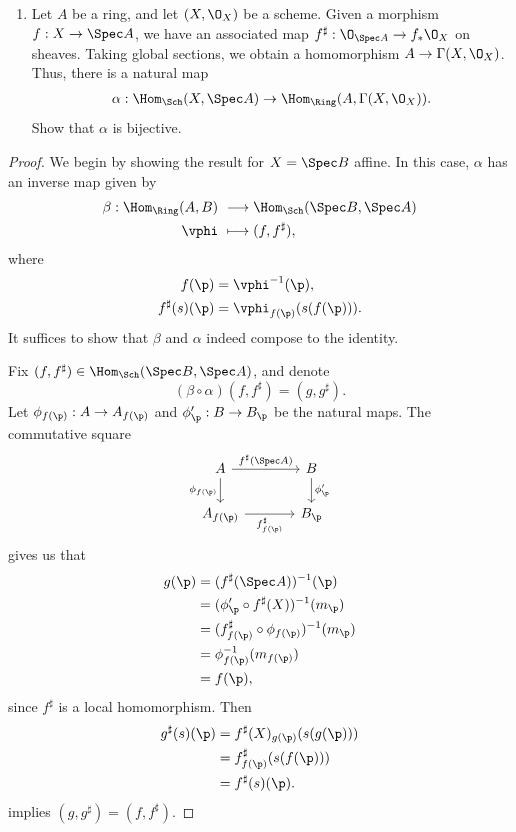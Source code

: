 \documentclass[12pt]{amsart}
\begin{document}
\begin{enumerate}
	\item[2.4.] {
      Let $A$ be a ring, and let $(X,\O_X)$ be a scheme.
      Given a morphism $f:X\to\Spec A$, we have an associated map $f^\sharp:\O_{\Spec A}\to f_*\O_X$ on sheaves.
      Taking global sections, we obtain a homomorphism $A\to\Gamma(X,\O_X)$.
      Thus, there is a natural map
      \begin{align*}
        \alpha:\Hom_{\Sch}(X,\Spec A)\to \Hom_{\Ring}(A,\Gamma(X,\O_X)).
      \end{align*}
      Show that $\alpha$ is bijective.
    }
\end{enumerate}

\begin{proof}
  We begin by showing the result for $X=\Spec B$ affine.
  In this case, $\alpha$ has an inverse map given by 
  \begin{align*}
    \beta:\Hom_{\Ring}(A,B)&~\longrightarrow \Hom_{\Sch}(\Spec B,\Spec A) \\
    \vphi&~\longmapsto (f,f^\sharp),
  \end{align*}
  where 
  \begin{align*}
    f(\p)&=\vphi^{-1}(\p), \\
    f^\sharp(s)(\p)&=\vphi_{f(\p)}(s(f(\p))).
  \end{align*}
  It suffices to show that $\beta$ and $\alpha$ indeed compose to the identity.

  Fix $(f,f^\sharp)\in \Hom_{\Sch}(\Spec B,\Spec A)$, and denote 
  \[
    (\beta\circ\alpha)(f,f^\sharp) = (g,g^\sharp).
  \]
  Let $\phi_{f(\p)}:A\to A_{f(\p)}$ and $\phi_\p':B\to B_\p$ be the natural maps.
  The commutative square
  \[
    \begin{tikzcd}[column sep = large]
      A\ar[d,"\phi_{f(\p)}"']
      \ar[r,"f^\sharp(\Spec A)"]&B\ar[d,"\phi'_\p"] \\
      A_{f(\p)}\ar[r,"f^\sharp_{f(\p)}"']&B_\p
    \end{tikzcd}
  \] 
  gives us that 
  \begin{align*}
    g(\p)&=(f^\sharp(\Spec A))^{-1}(\p) \\
         &=(\phi'_\p\circ f^\sharp(X))^{-1}(m_\p) \\
         &=(f_{f(\p)}^\sharp\circ \phi_{f(\p)})^{-1}(m_\p) \\
         &= {\phi}_{f(\p)}^{-1}(m_{f(\p)}) \\
         &= f(\p),
  \end{align*}
  since $f^\sharp$ is a local homomorphism.
  Then
  \begin{align*}
    g^\sharp(s)(\p) &= f^\sharp(X)_{g(\p)}(s(g(\p))) \\
                    &= f^\sharp_{f(\p)}(s(f(\p))) \\ 
                    &=f^\sharp(s)(\p).
  \end{align*}
  implies $(g,g^\sharp)=(f,f^\sharp)$.


\end{proof}
\end{document}

